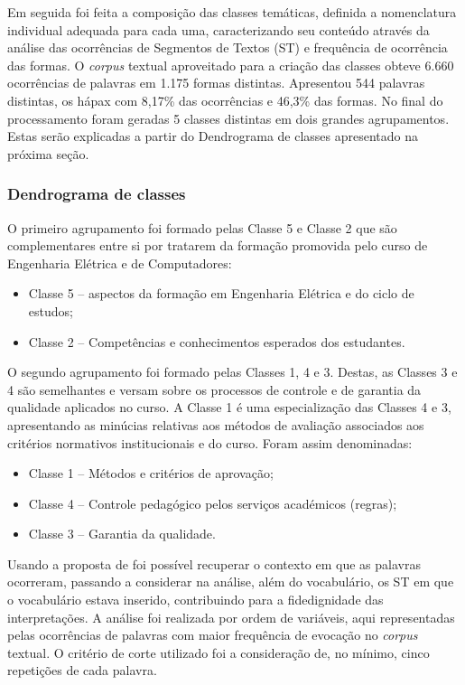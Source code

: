 \documentclass{textolivre}
\begin{document}
Em seguida foi feita a composição das classes temáticas, definida a nomenclatura individual adequada para cada uma, caracterizando seu conteúdo através da análise das ocorrências de Segmentos de Textos (ST) e frequência de ocorrência das formas.
O \textit{corpus} textual aproveitado para a criação das classes obteve 6.660 ocorrências de palavras em 1.175 formas distintas. Apresentou 544 palavras distintas, os hápax com 8,17\% das ocorrências e 46,3\% das formas. No final do processamento foram geradas 5 classes distintas em dois grandes agrupamentos. Estas serão explicadas a partir do Dendrograma de classes apresentado na próxima seção.

\subsubsection{Dendrograma de classes}\label{sec-dendrograma}
O primeiro agrupamento foi formado pelas Classe 5 e Classe 2 que são complementares entre si por tratarem da formação promovida pelo curso de Engenharia Elétrica e de Computadores:

\begin{itemize}
\item Classe 5 – aspectos da formação em Engenharia Elétrica e do ciclo de estudos;
\item Classe 2 – Competências e conhecimentos esperados dos estudantes.
\end{itemize}

O segundo agrupamento foi formado pelas Classes 1, 4 e 3. Destas, as Classes 3 e 4 são semelhantes e versam sobre os processos de controle e de garantia da qualidade aplicados no curso. A Classe 1 é uma especialização das Classes 4 e 3, apresentando as minúcias relativas aos métodos de avaliação associados aos critérios normativos institucionais e do curso. Foram assim denominadas:

\begin{itemize}
\item Classe 1 – Métodos e critérios de aprovação;
\item Classe 4 – Controle pedagógico pelos serviços académicos (regras);
\item Classe 3 – Garantia da qualidade.
\end{itemize}

Usando a proposta de \textcite{reinert1990} foi possível recuperar o contexto em que as palavras ocorreram, passando a considerar na análise, além do vocabulário, os ST em que o vocabulário estava inserido, contribuindo para a fidedignidade das interpretações. A análise foi realizada por ordem de variáveis, aqui representadas pelas ocorrências de palavras com maior frequência de evocação no \textit{corpus} textual. O critério de corte utilizado foi a consideração de, no mínimo, cinco repetições de cada palavra.
\end{document}
